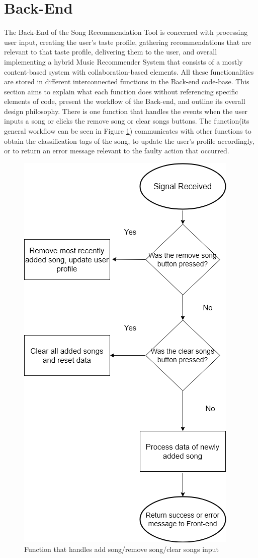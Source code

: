 \documentclass{l4proj}
\begin{document}
\section{Back-End}
The Back-End of the Song Recommendation Tool is concerned with processing user input, creating the user's taste profile, gathering recommendations that are relevant to that taste profile, delivering them to the user, and overall implementing a hybrid Music Recommender System that consists of a mostly content-based system with collaboration-based elements. All these functionalities are stored in different interconnected functions in the Back-end code-base. This section aims to explain what each function does without referencing specific elements of code, present the workflow of the Back-end, and outline its overall design philosophy. There is one function that handles the events when the user inputs a song or clicks the remove song or clear songs buttons. The function(its general workflow can be seen in Figure \ref{fig:receiveworkflow}) communicates with other functions to obtain the classification tags of the song, to update the user's profile accordingly, or to return an error message relevant to the faulty action that occurred.
\begin{figure}
    \centering
    \includegraphics[width=0.5\linewidth]{images/receive_song.drawio.png}
    \caption{Function that handles add song/remove song/clear songs input}
    \label{fig:receiveworkflow}
\end{figure}
\end{document}
